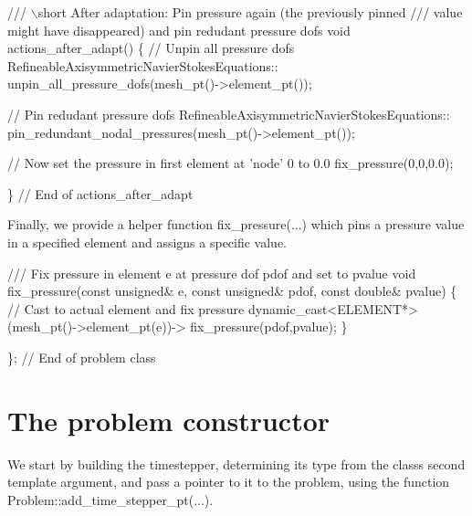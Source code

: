 \begin{DoxyCodeInclude}
 \textcolor{comment}{/// \(\backslash\)short After adaptation: Pin pressure again (the previously pinned}
\textcolor{comment}{ /// value might have disappeared) and pin redudant pressure dofs}
\textcolor{comment}{} \textcolor{keywordtype}{void} actions\_after\_adapt()
  \{
   \textcolor{comment}{// Unpin all pressure dofs}
   RefineableAxisymmetricNavierStokesEquations::
    unpin\_all\_pressure\_dofs(mesh\_pt()->element\_pt());
   
   \textcolor{comment}{// Pin redudant pressure dofs}
   RefineableAxisymmetricNavierStokesEquations::
    pin\_redundant\_nodal\_pressures(mesh\_pt()->element\_pt());
   
   \textcolor{comment}{// Now set the pressure in first element at 'node' 0 to 0.0}
   fix\_pressure(0,0,0.0);

  \} \textcolor{comment}{// End of actions\_after\_adapt}

\end{DoxyCodeInclude}


Finally, we provide a helper function {\ttfamily fix\+\_\+pressure}(...) which pins a pressure value in a specified element and assigns a specific value.


\begin{DoxyCodeInclude}
 \textcolor{comment}{/// Fix pressure in element e at pressure dof pdof and set to pvalue}
 \textcolor{keywordtype}{void} fix\_pressure(\textcolor{keyword}{const} \textcolor{keywordtype}{unsigned}& e,
                   \textcolor{keyword}{const} \textcolor{keywordtype}{unsigned}& pdof, 
                   \textcolor{keyword}{const} \textcolor{keywordtype}{double}& pvalue)
  \{
   \textcolor{comment}{// Cast to actual element and fix pressure}
   \textcolor{keyword}{dynamic\_cast<}ELEMENT*\textcolor{keyword}{>}(mesh\_pt()->element\_pt(e))->
    fix\_pressure(pdof,pvalue);
  \}

\}; \textcolor{comment}{// End of problem class}

\end{DoxyCodeInclude}




 

\hypertarget{index_constructor}{}\section{The problem constructor}\label{index_constructor}
We start by building the timestepper, determining its type from the class\textquotesingle{}s second template argument, and pass a pointer to it to the problem, using the function {\ttfamily Problem\+::add\+\_\+time\+\_\+stepper\+\_\+pt}(...).


